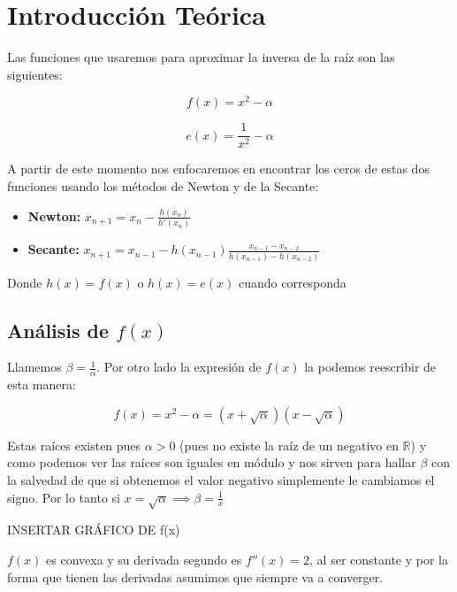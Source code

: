 \section{Introducción Teórica}

Las funciones que usaremos para aproximar la inversa de la raíz son las siguientes:

\begin{displaymath}
    f(x) = x^2 - \alpha
\end{displaymath}

\begin{displaymath}
    e(x) = \frac{1}{x^2} - \alpha
\end{displaymath}

A partir de este momento nos enfocaremos en encontrar los ceros de estas dos funciones usando los métodos de Newton y de la Secante:

\begin{itemize}
    \item {\bf Newton:} $\displaystyle x_{n + 1} = x_n - \frac{h(x_n)}{h'(x_n)}$

    \item {\bf Secante:} $\displaystyle x_{n + 1} = x_{n - 1} - h(x_{n - 1})\frac{x_{n - 1} - x_{n - 2}}{h(x_{n - 1}) - h(x_{n - 2})}$
\end{itemize}

Donde $h(x) = f(x)$ o $h(x) = e(x)$ cuando corresponda 

\subsection{Análisis de $f(x)$}

Llamemos $\displaystyle \beta = \frac{1}{\alpha}$. Por otro lado la expresión de $f(x)$ la podemos reescribir de esta manera:

\begin{displaymath}
    f(x) = x^2 - \alpha = (x + \sqrt{\alpha})(x - \sqrt{\alpha})
\end{displaymath}

Estas raíces existen pues $\alpha > 0$ (pues no existe la raíz de un negativo en $\mathbb{R}$) y como podemos ver las raíces son iguales en módulo y nos sirven para hallar $\beta$ con la salvedad de que si obtenemos el valor negativo simplemente le cambiamos el signo. Por lo tanto si $\displaystyle x = \sqrt{\alpha} \implies \beta = \frac{1}{x}$

INSERTAR GRÁFICO DE f(x)

$f(x)$ es convexa y su derivada segundo es $f''(x) = 2$, al ser constante y por la
forma que tienen las derivadas asumimos que siempre va a converger.

